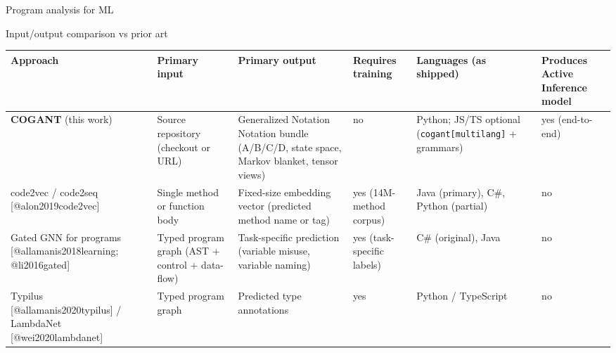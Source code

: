 \documentclass[
  ignorenonframetext,
]{beamer}
\newcounter{none} %
\begin{document}
\begin{frame}[fragile]{Program analysis for ML}
\begin{block}{Input/output comparison vs prior art}
{\def\LTcaptype{none} %
\begin{longtable}[]{@{}
  >{\raggedright\arraybackslash}p{}
  >{\raggedright\arraybackslash}p{}
  >{\raggedright\arraybackslash}p{}
  >{\centering\arraybackslash}p{}
  >{\raggedright\arraybackslash}p{}
  >{\centering\arraybackslash}p{}@{}}
\toprule\noalign{}
\begin{minipage}[b]{\linewidth}\raggedright
Approach
\end{minipage} & \begin{minipage}[b]{\linewidth}\raggedright
Primary input
\end{minipage} & \begin{minipage}[b]{\linewidth}\raggedright
Primary output
\end{minipage} & \begin{minipage}[b]{\linewidth}\centering
Requires training
\end{minipage} & \begin{minipage}[b]{\linewidth}\raggedright
Languages (as shipped)
\end{minipage} & \begin{minipage}[b]{\linewidth}\centering
Produces Active Inference model
\end{minipage} \\
\midrule\noalign{}
\endhead
\textbf{COGANT} (this work) & Source repository (checkout or URL) &
Generalized Notation Notation bundle (A/B/C/D, state space, Markov
blanket, tensor views) & no & Python; JS/TS optional
(\texttt{cogant{[}multilang{]}} + grammars) & yes (end-to-end) \\
code2vec / code2seq {[}@alon2019code2vec{]} & Single method or function
body & Fixed-size embedding vector (predicted method name or tag) & yes
(14M-method corpus) & Java (primary), C\#, Python (partial) & no \\
Gated GNN for programs {[}@allamanis2018learning; @li2016gated{]} &
Typed program graph (AST + control + data-flow) & Task-specific
prediction (variable misuse, variable naming) & yes (task-specific
labels) & C\# (original), Java & no \\
Typilus {[}@allamanis2020typilus{]} / LambdaNet {[}@wei2020lambdanet{]}
& Typed program graph & Predicted type annotations & yes & Python /
TypeScript & no \\

\end{longtable}}
\end{block}
\end{frame}
\end{document}
